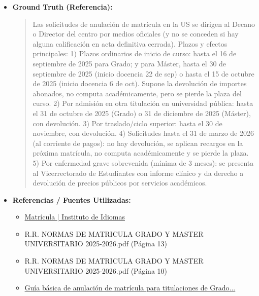 \documentclass[12pt,a4paper,oneside]{report}
\begin{document}
\begin{itemize}
\begin{itemize}
\begin{quote}
Recuerde que la anulación de matrícula puede tener diferentes efectos según la fecha en que se solicite y las circunstancias específicas de cada caso. Es importante leer detenidamente las Normas de Matrícula de la Universidad de Sevilla y consultar con la secretaría de su facultad si tiene alguna duda.
                \end{quote}
          \item \textbf{{Ground Truth (Referencia):}} \\
                \begin{quote}
Las solicitudes de anulación de matrícula en la US se dirigen al Decano o Director del centro por medios oficiales (y no se conceden si hay alguna calificación en acta definitiva cerrada). Plazos y efectos principales: 1) Plazos ordinarios de inicio de curso: hasta el 16 de septiembre de 2025 para Grado; y para Máster, hasta el 30 de septiembre de 2025 (inicio docencia 22 de sep) o hasta el 15 de octubre de 2025 (inicio docencia 6 de oct). Supone la devolución de importes abonados, no computa académicamente, pero se pierde la plaza del curso. 2) Por admisión en otra titulación en universidad pública: hasta el 31 de octubre de 2025 (Grado) o 31 de diciembre de 2025 (Máster), con devolución. 3) Por traslado/ciclo superior: hasta el 30 de noviembre, con devolución. 4) Solicitudes hasta el 31 de marzo de 2026 (al corriente de pagos): no hay devolución, se aplican recargos en la próxima matrícula, no computa académicamente y se pierde la plaza. 5) Por enfermedad grave sobrevenida (mínima de 3 meses): se presenta al Vicerrectorado de Estudiantes con informe clínico y da derecho a devolución de precios públicos por servicios académicos.
                \end{quote}
          \item \textbf{{Referencias / Fuentes Utilizadas:}} \\
                \begin{itemize}
                  \item \href{https://institutodeidiomas.us.es/areas-idiomas/espanol/matricula}{Matrícula | Instituto de Idiomas}
                  \item R.R. NORMAS DE MATRICULA GRADO Y MASTER UNIVERSITARIO 2025-2026.pdf (Página 13)
                  \item R.R. NORMAS DE MATRICULA GRADO Y MASTER UNIVERSITARIO 2025-2026.pdf (Página 10)
                  \item \href{https://cat.us.es/index.php/matricula/guia-basica-de-anulacion-de-matricula-para-titulaciones-de-grado-y-master}{Guía básica de anulación de matrícula para titulaciones de Grado...}

\end{itemize}
\end{itemize}
\end{itemize}
\end{document}
